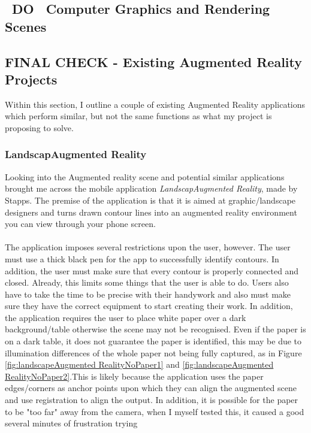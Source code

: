 \documentclass[11pt]{article}
\begin{document}
\subsection{~DO~ Computer Graphics and Rendering Scenes}

\subsection{FINAL CHECK - Existing Augmented Reality Projects}
Within this section, I outline a couple of existing Augmented Reality 
applications which perform similar, but not the same functions as 
what my project is proposing to solve.

\subsubsection{LandscapAugmented Reality}
\label{LandscapAugmented Reality}
Looking into the Augmented reality scene and potential similar
applications brought me across the mobile application \textit{LandscapAugmented Reality},
made by Stapps. The premise of the application is that it is aimed at
graphic/landscape designers and turns drawn contour lines into an augmented
reality environment you can view through your phone screen. \\
\\
The application imposes several restrictions upon the user, however. The user
must use a thick black pen for the app to successfully identify contours. 
In addition, the user must make sure that every contour is properly connected
and closed. Already, this limits some things that the user is able to do.
Users also have to take the time to be precise with their handywork and also 
must make sure they have the 
correct equipment to start creating their work. In addition, the application
requires the user to place white paper over a dark background/table otherwise
the scene may not be recognised. Even if the paper is on a dark table, it 
does not guarantee the paper is identified, this may be due to illumination
differences of the whole paper not being fully captured, as in 
Figure \ref{fig:landscapeAugmented RealityNoPaper1} and \ref{fig:landscapeAugmented RealityNoPaper2}.This 
is likely because the application uses 
the paper edges/corners as anchor points upon which they can align the 
augmented scene and use registration to align the output. In addition, it
is possible for the paper to be "too far" away from the camera, when I
myself tested this, it caused a good several minutes of frustration trying
\end{document}
